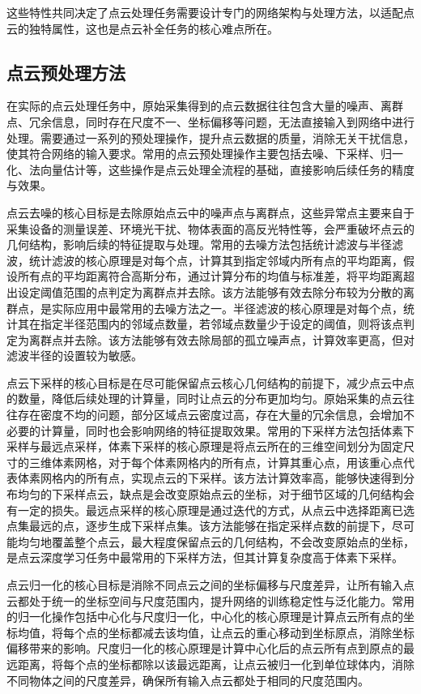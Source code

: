 这些特性共同决定了点云处理任务需要设计专门的网络架构与处理方法，以适配点云的独特属性，这也是点云补全任务的核心难点所在\cite{xiang2021snowflakenet}。

\subsection{点云预处理方法}
在实际的点云处理任务中，原始采集得到的点云数据往往包含大量的噪声、离群点、冗余信息，同时存在尺度不一、坐标偏移等问题，无法直接输入到网络中进行处理。需要通过一系列的预处理操作，提升点云数据的质量，消除无关干扰信息，使其符合网络的输入要求。常用的点云预处理操作主要包括去噪、下采样、归一化、法向量估计等，这些操作是点云处理全流程的基础，直接影响后续任务的精度与效果。

点云去噪的核心目标是去除原始点云中的噪声点与离群点，这些异常点主要来自于采集设备的测量误差、环境光干扰、物体表面的高反光特性等，会严重破坏点云的几何结构，影响后续的特征提取与处理。常用的去噪方法包括统计滤波与半径滤波，统计滤波的核心原理是对每个点，计算其到指定邻域内所有点的平均距离，假设所有点的平均距离符合高斯分布，通过计算分布的均值与标准差，将平均距离超出设定阈值范围的点判定为离群点并去除。该方法能够有效去除分布较为分散的离群点，是实际应用中最常用的去噪方法之一。半径滤波的核心原理是对每个点，统计其在指定半径范围内的邻域点数量，若邻域点数量少于设定的阈值，则将该点判定为离群点并去除。该方法能够有效去除局部的孤立噪声点，计算效率更高，但对滤波半径的设置较为敏感。

点云下采样的核心目标是在尽可能保留点云核心几何结构的前提下，减少点云中点的数量，降低后续处理的计算量，同时让点云的分布更加均匀。原始采集的点云往往存在密度不均的问题，部分区域点云密度过高，存在大量的冗余信息，会增加不必要的计算量，同时也会影响网络的特征提取效果。常用的下采样方法包括体素下采样与最远点采样，体素下采样的核心原理是将点云所在的三维空间划分为固定尺寸的三维体素网格，对于每个体素网格内的所有点，计算其重心点，用该重心点代表体素网格内的所有点，实现点云的下采样。该方法计算效率高，能够快速得到分布均匀的下采样点云，缺点是会改变原始点云的坐标，对于细节区域的几何结构会有一定的损失。最远点采样的核心原理是通过迭代的方式，从点云中选择距离已选点集最远的点，逐步生成下采样点集。该方法能够在指定采样点数的前提下，尽可能均匀地覆盖整个点云，最大程度保留点云的几何结构，不会改变原始点的坐标，是点云深度学习任务中最常用的下采样方法，但其计算复杂度高于体素下采样。

点云归一化的核心目标是消除不同点云之间的坐标偏移与尺度差异，让所有输入点云都处于统一的坐标空间与尺度范围内，提升网络的训练稳定性与泛化能力。常用的归一化操作包括中心化与尺度归一化，中心化的核心原理是计算点云所有点的坐标均值，将每个点的坐标都减去该均值，让点云的重心移动到坐标原点，消除坐标偏移带来的影响。尺度归一化的核心原理是计算中心化后的点云所有点到原点的最远距离，将每个点的坐标都除以该最远距离，让点云被归一化到单位球体内，消除不同物体之间的尺度差异，确保所有输入点云都处于相同的尺度范围内。


